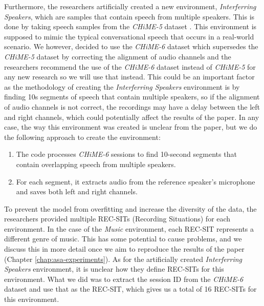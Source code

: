 \documentclass[logo,bsc,singlespacing,parskip,online]{infthesis}
\newcommand{\chime}[1]{\textit{CHiME-#1}\xspace}
\begin{document}
Furthermore, the researchers artificially created a new environment, \textit{Interferring Speakers}, which are samples that contain speech from multiple speakers. 
This is done by taking speech samples from the
\chime{5} dataset \cite{barker18_fifth_2018}. This environment is supposed to mimic the 
typical conversational speech that occurs in a real-world scenario. We however, decided to use the \chime{6} dataset which 
supersedes the \chime{5} dataset \cite{barker18_fifth_2018} by correcting the alignment of audio channels and the researchers 
recommend the use of the \chime{6} dataset instead of \chime{5} for any new research so we will use that instead. This could 
be an important factor as the methodology of creating the \textit{Interferring Speakers} environment is by finding 10s 
segments of speech that contain multiple speakers, so if the alignment of audio channels is not correct, the recordings 
may have a delay between the left and right channels, which could potentially affect the results of the paper. 
In any case, the way this environment was created is unclear from the paper, but we do the following approach to create the environment:
\begin{enumerate}
   \item The code processes \chime{6} sessions to find 10-second segments that contain overlapping speech from multiple speakers.
   \item For each segment, it extracts audio from the reference speaker's microphone and saves both left and right channels.
\end{enumerate}

To prevent the model from overfitting and increase the diversity of the data, the researchers provided multiple REC-SITs (Recording Situations) for each environment.
In the case of the \textit{Music} environment, each REC-SIT represents a different genre of music. This has some potential to cause problems, 
and we discuss this in more detail once we aim to reproduce the results of the paper (Chapter \ref{chap:asa-experiments}).  %
As for the artificially created \textit{Interferring Speakers} environment, it is unclear how they define REC-SITs for this environment. 
What we did was to extract the session ID from the \chime{6} dataset and use that as the REC-SIT, which 
gives us a total of 16 REC-SITs for this environment.
\end{document}
